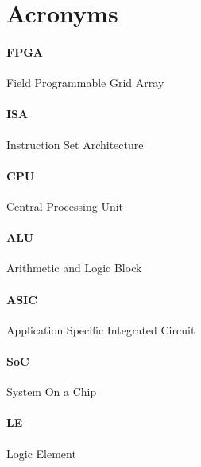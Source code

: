 \documentclass[twocolumn]{article}
\begin{document}
\section{Acronyms}
\paragraph{FPGA} Field Programmable Grid Array
\paragraph{ISA} Instruction Set Architecture
\paragraph{CPU} Central Processing Unit
\paragraph{ALU} Arithmetic and Logic Block
\paragraph{ASIC} Application Specific Integrated Circuit
\paragraph{SoC} System On a Chip
\paragraph{LE} Logic Element

\printbibliography
\end{document}
